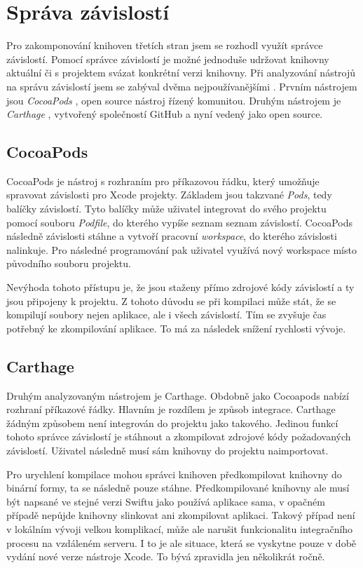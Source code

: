 \section{Správa závislostí}\label{analyza-sprava-zavislosti}

Pro zakomponování knihoven třetích stran jsem se rozhodl využít správce závislostí.
Pomocí správce závislostí je možné jednoduše udržovat knihovny aktuální či s projektem svázat konkrétní verzi knihovny.
Při analyzování nástrojů na správu závislostí jsem se zabýval dvěma nejpoužívanějšími \cite{shashikantjagtap-swift-dependency-management}.
Prvním nástrojem jsou \textit{CocoaPods} \cite{cocoapods-about}, open source nástroj řízený komunitou.
Druhým nástrojem je \textit{Carthage} \cite{github-carthage}, vytvořený společností GitHub a nyní vedený jako open source.

\subsection{CocoaPods}

CocoaPods je nástroj s rozhraním pro příkazovou řádku, který umožňuje spravovat závislosti pro Xcode projekty.
Základem jsou takzvané \textit{Pods}, tedy balíčky závislostí.
Tyto balíčky může uživatel integrovat do svého projektu pomocí souboru \textit{Podfile}, do kterého vypíše seznam seznam závislostí.
CocoaPods následně závislosti stáhne a vytvoří pracovní \textit{workspace}, do kterého závislosti nalinkuje.
Pro následné programování pak uživatel využívá nový workspace místo původního souboru projektu.

Nevýhoda tohoto přístupu je, že jsou staženy přímo zdrojové kódy závislostí a ty jsou připojeny k projektu.
Z tohoto důvodu se při kompilaci může stát, že se kompilují soubory nejen aplikace, ale i všech závislostí.
Tím se zvyšuje čas potřebný ke zkompilování aplikace.
To má za následek snížení rychlosti vývoje.

\subsection{Carthage}

Druhým analyzovaným nástrojem je Carthage.
Obdobně jako Cocoapods nabízí rozhraní příkazové řádky.
Hlavním je rozdílem je způsob integrace.
Carthage žádným způsobem není integrován do projektu jako takového.
Jedinou funkcí tohoto správce závislostí je stáhnout a zkompilovat zdrojové kódy požadovaných závislostí.
Uživatel následně musí sám knihovny do projektu naimportovat.

Pro urychlení kompilace mohou správci knihoven předkompilovat knihovny do binární formy, ta se následně pouze stáhne.
Předkompilované knihovny ale musí být napsané ve stejné verzi Swiftu jako používá aplikace sama, v opačném případě nepůjde knihovny slinkovat ani zkompilovat aplikaci.
Takový případ není v lokálním vývoji velkou komplikací, může ale narušit funkcionalitu integračního procesu na vzdáleném serveru.
I to je ale situace, která se vyskytne pouze v době vydání nové verze nástroje Xcode.
To bývá zpravidla jen několikrát ročně.
